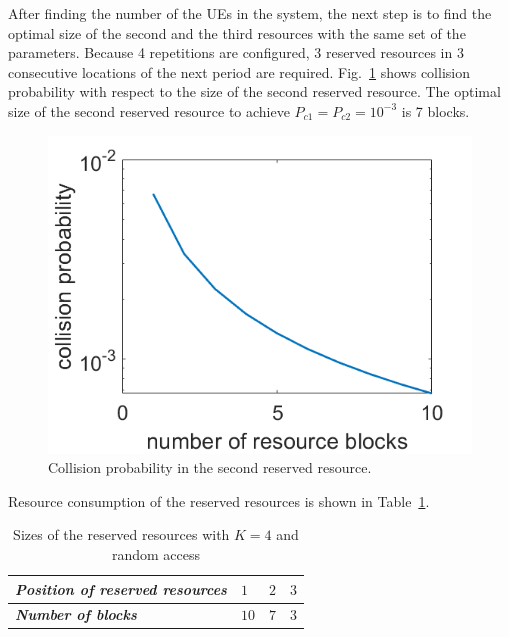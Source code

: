 \documentclass{ieeeaccess}
\begin{document}
After finding the number of the UEs in the system, the next step is to find the optimal size of the second and the third resources with the same set of the parameters. Because 4 repetitions are configured, 3 reserved resources in 3 consecutive locations of the next period are required. Fig.~\ref{fig13} shows collision probability with respect to the size of the second reserved resource. The optimal size of the second reserved resource to achieve $P_{c1} = P_{c2} = 10^{-3}$ is 7 blocks.

\begin{figure}[htbp]
\centerline{\includegraphics[scale=0.35]{fig13.png}}
\caption{Collision probability in the second reserved resource.}
\label{fig13}

\end{figure}

Resource consumption of the reserved resources is shown in Table~\ref{tab3}.

\begin{table}[htbp]
\caption{Sizes of the reserved resources with $K=4$ and random access}
\begin{center}
\begin{tabular}{|p{10em}|p{2em}|p{2em}|p{2em}|}
 \hline
 \textbf{\textit{Position of reserved resources}} & $1$ &$2$ &$3$ \\ 
 \hline
 \textbf{\textit{Number of blocks}} & $10$ &$7$ &$3$ \\

 
 \hline
\end{tabular}
\label{tab3}
\end{center}

\end{table}
\end{document}
